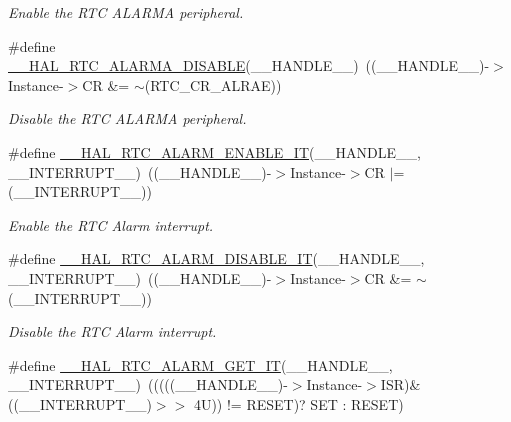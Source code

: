\begin{DoxyCompactItemize}
\begin{DoxyCompactList}\small\item\em Enable the R\+TC A\+L\+A\+R\+MA peripheral. \end{DoxyCompactList}\item 
\#define \hyperlink{group___r_t_c___exported___macros_ga8679ec8def03e05fa39474d83b156699}{\+\_\+\+\_\+\+H\+A\+L\+\_\+\+R\+T\+C\+\_\+\+A\+L\+A\+R\+M\+A\+\_\+\+D\+I\+S\+A\+B\+LE}(\+\_\+\+\_\+\+H\+A\+N\+D\+L\+E\+\_\+\+\_\+)~((\+\_\+\+\_\+\+H\+A\+N\+D\+L\+E\+\_\+\+\_\+)-\/$>$Instance-\/$>$CR \&= $\sim$(R\+T\+C\+\_\+\+C\+R\+\_\+\+A\+L\+R\+AE))
\begin{DoxyCompactList}\small\item\em Disable the R\+TC A\+L\+A\+R\+MA peripheral. \end{DoxyCompactList}\item 
\#define \hyperlink{group___r_t_c___exported___macros_gab40f07ff2cdf6fc98ccfdd856ba934e4}{\+\_\+\+\_\+\+H\+A\+L\+\_\+\+R\+T\+C\+\_\+\+A\+L\+A\+R\+M\+\_\+\+E\+N\+A\+B\+L\+E\+\_\+\+IT}(\+\_\+\+\_\+\+H\+A\+N\+D\+L\+E\+\_\+\+\_\+,  \+\_\+\+\_\+\+I\+N\+T\+E\+R\+R\+U\+P\+T\+\_\+\+\_\+)~((\+\_\+\+\_\+\+H\+A\+N\+D\+L\+E\+\_\+\+\_\+)-\/$>$Instance-\/$>$CR $\vert$= (\+\_\+\+\_\+\+I\+N\+T\+E\+R\+R\+U\+P\+T\+\_\+\+\_\+))
\begin{DoxyCompactList}\small\item\em Enable the R\+TC Alarm interrupt. \end{DoxyCompactList}\item 
\#define \hyperlink{group___r_t_c___exported___macros_gadc2d6dc4a75136bdd2b67c1b35d04b10}{\+\_\+\+\_\+\+H\+A\+L\+\_\+\+R\+T\+C\+\_\+\+A\+L\+A\+R\+M\+\_\+\+D\+I\+S\+A\+B\+L\+E\+\_\+\+IT}(\+\_\+\+\_\+\+H\+A\+N\+D\+L\+E\+\_\+\+\_\+,  \+\_\+\+\_\+\+I\+N\+T\+E\+R\+R\+U\+P\+T\+\_\+\+\_\+)~((\+\_\+\+\_\+\+H\+A\+N\+D\+L\+E\+\_\+\+\_\+)-\/$>$Instance-\/$>$CR \&= $\sim$(\+\_\+\+\_\+\+I\+N\+T\+E\+R\+R\+U\+P\+T\+\_\+\+\_\+))
\begin{DoxyCompactList}\small\item\em Disable the R\+TC Alarm interrupt. \end{DoxyCompactList}\item 
\#define \hyperlink{group___r_t_c___exported___macros_gaf748b95b91cca959f79f441a90678c60}{\+\_\+\+\_\+\+H\+A\+L\+\_\+\+R\+T\+C\+\_\+\+A\+L\+A\+R\+M\+\_\+\+G\+E\+T\+\_\+\+IT}(\+\_\+\+\_\+\+H\+A\+N\+D\+L\+E\+\_\+\+\_\+,  \+\_\+\+\_\+\+I\+N\+T\+E\+R\+R\+U\+P\+T\+\_\+\+\_\+)~(((((\+\_\+\+\_\+\+H\+A\+N\+D\+L\+E\+\_\+\+\_\+)-\/$>$Instance-\/$>$I\+SR)\& ((\+\_\+\+\_\+\+I\+N\+T\+E\+R\+R\+U\+P\+T\+\_\+\+\_\+)$>$$>$ 4\+U)) != R\+E\+S\+E\+T)? S\+E\+T \+: R\+E\+S\+E\+T)
$$
\end{DoxyCompactItemize}
